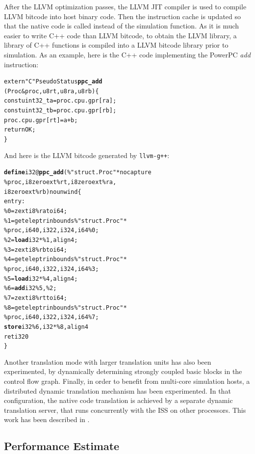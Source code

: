 \documentclass{llncs}
\begin{document}
After the LLVM optimization passes, the LLVM JIT compiler is used to
compile LLVM bitcode into host binary code. Then the instruction cache
is updated so that the native code is called instead of the simulation
function.  As it is much easier to write C++ code than LLVM bitcode,
to obtain the LLVM library, a library of C++ functions is compiled
into a LLVM bitcode library prior to simulation. As an example, here
is the C++ code implementing the PowerPC {\em add} instruction:

{\small
\begin{alltt}
  extern "C" PseudoStatus \textbf{ppc_add}
            (Proc &proc, u8 rt, u8 ra, u8 rb) \verb|{|
   const uint32_t a = proc.cpu.gpr[ra];
   const uint32_t b = proc.cpu.gpr[rb];
   proc.cpu.gpr[rt] = a+b;
   return OK;
 \verb|}|
\end{alltt}
}

\noindent And here is the LLVM bitcode generated by {\tt llvm-g++}:

{\small
\begin{alltt}
  \textbf{define} i32 @\textbf{ppc_add}(\%"struct.Proc"* nocapture
         \%proc, i8 zeroext \%rt, i8 zeroext \%ra,
                     i8 zeroext \%rb) nounwind \verb|{|
  entry:
   \%0 = zext i8 \%ra to i64;
   \%1 = geteleptr inbounds \%"struct.Proc"*
            \%proc, i64 0, i32 2, i32 4, i64 \%0;
   \%2 = \textbf{load} i32* \%1, align 4;
   \%3 = zext i8 \%rb to i64;
   \%4 = geteleptr inbounds \%"struct.Proc"*
            \%proc, i64 0, i32 2, i32 4, i64 \%3;
   \%5 = \textbf{load} i32* \%4, align 4;
   \%6 = \textbf{add} i32 \%5, \%2;
   \%7 = zext i8 \%rt to i64;
   \%8 = geteleptr inbounds \%"struct.Proc"*
            \%proc, i64 0, i32 2, i32 4, i64 \%7;
   \textbf{store} i32 \%6, i32* \%8, align 4
   ret i32 0
 \verb|}|
\end{alltt}}

Another translation mode with larger translation units has also been
experimented, by dynamically determining strongly coupled basic
blocks in the control flow graph. Finally, in order to benefit from
multi-core simulation hosts, a distributed dynamic translation
mechanism has been experimented.  In that configuration, the native
code translation is achieved by a separate dynamic translation server,
that runs concurrently with the ISS on other processors. This work has
been described in \cite{amasbt-2012}.

\subsection{Performance Estimate}
\end{document}
